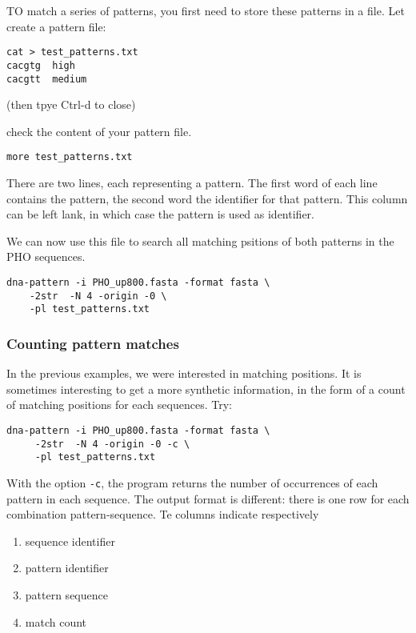 TO match a series of patterns, you first need to store these patterns
in a file. Let create a pattern file:

\begin{verbatim}
cat > test_patterns.txt
cacgtg	high
cacgtt	medium
\end{verbatim}
(then tpye Ctrl-d to close)

check the content of your pattern file.
\begin{verbatim}
more test_patterns.txt
\end{verbatim}

There are two lines, each representing a pattern. The first word of
each line contains the pattern, the second word the identifier for
that pattern. This column can be left lank, in which case the pattern
is used as identifier.

We can now use this file to search all matching psitions of both
patterns in the PHO sequences.

\begin{verbatim}
dna-pattern -i PHO_up800.fasta -format fasta \
    -2str  -N 4 -origin -0 \
    -pl test_patterns.txt
\end{verbatim}

\subsubsection{Counting pattern matches}

In the previous examples, we were interested in matching positions. It
is sometimes interesting to get a more synthetic information, in the
form of a count of matching positions for each sequences. Try:

\begin{verbatim}
dna-pattern -i PHO_up800.fasta -format fasta \ 
     -2str  -N 4 -origin -0 -c \
     -pl test_patterns.txt
\end{verbatim}

With the option \texttt{-c}, the program returns the number of
occurrences of each pattern in each sequence. The output format is
different: there is one row for each combination pattern-sequence. Te
columns indicate respectively
\begin{enumerate}
\item sequence identifier
\item pattern identifier
\item pattern sequence
\item match count
\end{enumerate}

